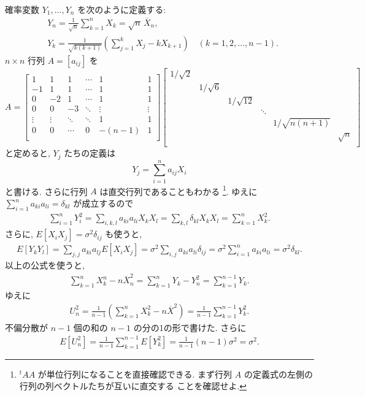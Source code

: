 \documentclass[12pt,twoside]{jarticle}
\newcommand\Xbar{{\overline X}}
\theoremstyle{jplain}
\theoremstyle{jplain}
\theoremstyle{jplain}
\numberwithin{theorem}{section}
\numberwithin{equation}{section}
\numberwithin{figure}{section}
\numberwithin{table}{section}
\begin{document}
確率変数 $Y_1,\ldots,Y_n$ を次のように定義する:
\begin{align*}
&
Y_n = \frac{1}{\sqrt{n}}\sum_{k=1}^n X_k = \sqrt{n}\,\Xbar_n,
\\ &
Y_k = \frac{1}{\sqrt{k(k+1)}}\left(\sum_{j=1}^k X_j - k X_{k+1}\right)
\quad (k=1,2,\ldots,n-1).
\end{align*}
$n\times n$ 行列 $A=[a_{ij}]$ を
\[
A=
\begin{bmatrix}
 1 & 1 & 1 & \cdots & 1 & 1 \\
-1 & 1 & 1 & \cdots & 1 & 1 \\
 0 &-2 & 1 & \cdots & 1 & 1 \\
 0 & 0 &-3 & \ddots & \vdots & \vdots \\
 \vdots & \vdots & \ddots & \ddots & 1 & 1 \\ 
 0 & 0 & \cdots & 0 & -(n-1) & 1 \\
\end{bmatrix}
\begin{bmatrix}
1/\sqrt{2} \\
           & 1/\sqrt{6} \\
           &          & 1/\sqrt{12} \\
           &          &           & \ddots \\
           &          &           &        & 1/\sqrt{n(n+1)} \\
           &          &           &        &               & \sqrt{n} \\
\end{bmatrix}
\]
と定めると, $Y_j$ たちの定義は
\[
Y_j = \sum_{i=1}^n a_{ij} X_i
\]
と書ける. さらに行列 $A$ は直交行列であることもわかる%
\footnote{${}^t AA$ が単位行列になることを直接確認できる.
まず行列 $A$ の定義式の左側の行列の列ベクトルたちが互いに直交する
ことを確認せよ.}.
ゆえに $\sum_{i=1}^n a_{ki}a_{li}=\delta_{kl}$ が成立するので
\begin{align*}
\sum_{i=1}^n Y_i^2 
= \sum_{i,k,l} a_{ki}a_{li} X_k X_l
= \sum_{k,l}\delta_{kl} X_k X_l
= \sum_{k=1}^n X_k^2.
\end{align*}
さらに, $E[X_i X_j]=\sigma^2\delta_{ij}$ も使うと,
\begin{align*}
E[Y_k Y_l] 
=\sum_{j,j} a_{ki}a_{lj}E[X_i X_j]
=\sigma^2 \sum_{i,j} a_{ki}a_{li}\delta_{ij}
=\sigma^2 \sum_{i=1}^n a_{ki}a_{li}
=\sigma^2 \delta_{kl}.
\end{align*}
以上の公式を使うと, 
\begin{align*}
\sum_{k=1}^n X_k^n - n\Xbar_n^2 
= \sum_{k=1}^n Y_k - Y_n^2 
= \sum_{k=1}^{n-1} Y_k.
\end{align*}
ゆえに
\begin{align*}
U_n^2
=\frac{1}{n-1}\left(\sum_{k=1}^n X_k^2 - n\Xbar^2\right)
=\frac{1}{n-1}\sum_{k=1}^{n-1}Y_k^2.
\end{align*}
不偏分散が $n-1$ 個の和の $n-1$ の分の1の形で書けた.
さらに
\begin{align*}
E[U_n^2] = \frac{1}{n-1}\sum_{k=1}^{n-1}E[Y_k^2] 
=\frac{1}{n-1}(n-1)\sigma^2=\sigma^2.
\end{align*}
\end{document}
